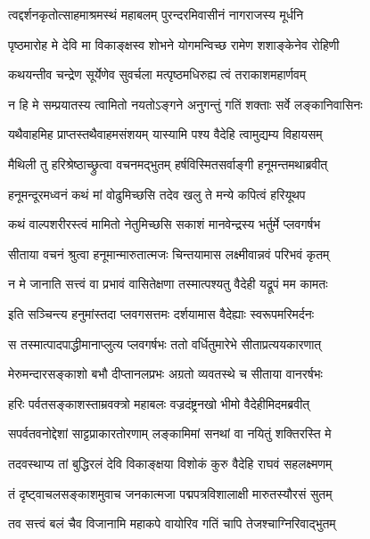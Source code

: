 \twolineshloka
{त्वद्दर्शनकृतोत्साहमाश्रमस्थं महाबलम्}
{पुरन्दरमिवासीनं नागराजस्य मूर्धनि} %

\twolineshloka
{पृष्ठमारोह मे देवि मा विकाङ्क्षस्व शोभने}
{योगमन्विच्छ रामेण शशाङ्केनेव रोहिणी} %

\twolineshloka
{कथयन्तीव चन्द्रेण सूर्येणेव सुवर्चला}
{मत्पृष्ठमधिरुह्य त्वं तराकाशमहार्णवम्} %

\twolineshloka
{न हि मे सम्प्रयातस्य त्वामितो नयतोऽङ्गने}
{अनुगन्तुं गतिं शक्ताः सर्वे लङ्कानिवासिनः} %

\twolineshloka
{यथैवाहमिह प्राप्तस्तथैवाहमसंशयम्}
{यास्यामि पश्य वैदेहि त्वामुद्यम्य विहायसम्} %

\twolineshloka
{मैथिली तु हरिश्रेष्ठाच्छ्रुत्वा वचनमद्भुतम्}
{हर्षविस्मितसर्वाङ्गी हनूमन्तमथाब्रवीत्} %

\twolineshloka
{हनूमन्दूरमध्वनं कथं मां वोढुमिच्छसि}
{तदेव खलु ते मन्ये कपित्वं हरियूथप} %

\twolineshloka
{कथं वाल्पशरीरस्त्वं मामितो नेतुमिच्छसि}
{सकाशं मानवेन्द्रस्य भर्तुर्मे प्लवगर्षभ} %

\twolineshloka
{सीताया वचनं श्रुत्वा हनूमान्मारुतात्मजः}
{चिन्तयामास लक्ष्मीवान्नवं परिभवं कृतम्} %

\twolineshloka
{न मे जानाति सत्त्वं वा प्रभावं वासितेक्षणा}
{तस्मात्पश्यतु वैदेही यद्रूपं मम कामतः} %

\twolineshloka
{इति सञ्चिन्त्य हनुमांस्तदा प्लवगसत्तमः}
{दर्शयामास वैदेह्याः स्वरूपमरिमर्दनः} %

\twolineshloka
{स तस्मात्पादपाद्धीमानाप्लुत्य प्लवगर्षभः}
{ततो वर्धितुमारेभे सीताप्रत्ययकारणात्} %

\twolineshloka
{मेरुमन्दारसङ्काशो बभौ दीप्तानलप्रभः}
{अग्रतो व्यवतस्थे च सीताया वानरर्षभः} %

\twolineshloka
{हरिः पर्वतसङ्काशस्ताम्रवक्त्रो महाबलः}
{वज्रदंष्ट्रनखो भीमो वैदेहीमिदमब्रवीत्} %

\twolineshloka
{सपर्वतवनोद्देशां साट्टप्राकारतोरणाम्}
{लङ्कामिमां सनथां वा नयितुं शक्तिरस्ति मे} %

\twolineshloka
{तदवस्थाप्य तां बुद्धिरलं देवि विकाङ्क्षया}
{विशोकं कुरु वैदेहि राघवं सहलक्ष्मणम्} %

\twolineshloka
{तं दृष्ट्वाचलसङ्काशमुवाच जनकात्मजा}
{पद्मपत्रविशालाक्षी मारुतस्यौरसं सुतम्} %

\twolineshloka
{तव सत्त्वं बलं चैव विजानामि महाकपे}
{वायोरिव गतिं चापि तेजश्चाग्निरिवाद्भुतम्} %

